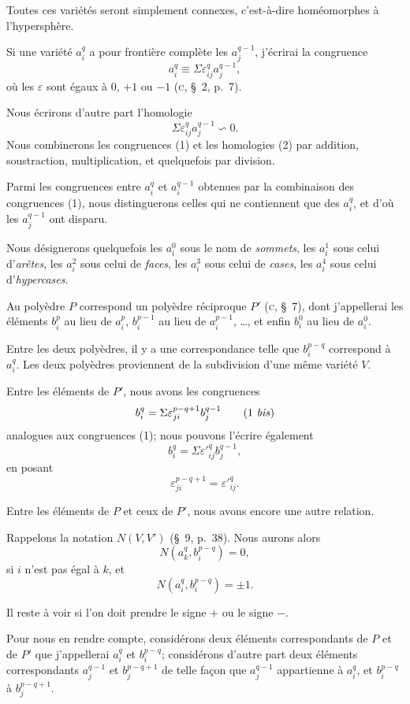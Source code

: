 \documentclass{article}
\begin{document}
Toutes ces variétés seront simplement connexes, c'est-à-dire homéomorphes à l'hypersphère.

Si une variété $a^{q}_{i}$ a pour frontière complète les $a^{q-1}_{j}$, j'écrirai la congruence
\[ a^{q}_{i} \equiv \Sigma \varepsilon^{q}_{ij} a^{q-1}_{j}, \tag{1} \]
où les $\varepsilon$ sont égaux à 0, $+1$ ou $-1$ (\textsc{c}, \S~2, p.\ 7).

Nous écrirons d'autre part l'homologie
\[ \Sigma \varepsilon^{q}_{ij} a^{q-1}_{j} \backsim 0. \tag{2} \]
Nous combinerons les congruences (1) et les homologies (2) par addition, soustraction, multiplication, et quelquefois par division.

Parmi les congruences entre $a^{q}_{i}$ et $a^{q-1}_{i}$ obtenues par la combinaison des congruences (1), nous distinguerons celles qui ne contiennent que des $a^{q}_{i}$, et d'où les $a^{q-1}_{j}$ ont disparu.

Nous désignerons quelquefois les $a^{0}_{i}$ sous le nom de \emph{sommets}, les $a^{1}_{i}$ sous celui d'\emph{arêtes}, les $a^{2}_{i}$ sous celui de \emph{faces}, les $a^{3}_{i}$ sous celui de \emph{cases}, les $a^{4}_{i}$ sous celui d'\emph{hypercases}.

Au polyèdre $P$ correspond un polyèdre réciproque $P'$ (\textsc{c}, \S~7), dont j'appellerai les éléments $b^{p}_{i}$ au lieu de $a^{p}_{i}$, $b^{p-1}_{i}$ au lieu de $a^{p-1}_{i}$, \ldots, et enfin $b^{0}_{i}$ au lieu de $a^{0}_{i}$.

Entre les deux polyèdres, il y a une correspondance telle que $b^{p-q}_{i}$ correspond à $a^{q}_{i}$. Les deux polyèdres proviennent de la subdivision d'une même variété $V$.

Entre les éléments de $P'$, nous avons les congruences
\[ b^{q}_{i} = \Sigma \varepsilon^{p-q+1}_{ji} b^{q-1}_{j} \tag{1 \textit{bis}} \]
analogues aux congruences (1); nous pouvons l'écrire également
\[ b^{q}_{i} = \Sigma \varepsilon'^{q}_{ij} b^{q-1}_{j}, \]
en posant
\[ \varepsilon^{p-q+1}_{ji} = \varepsilon'^{q}_{ij}. \]

Entre les éléments de $P$ et ceux de $P'$, nous avons encore une autre relation.

Rappelons la notation $N(V, V')$ (\S~9, p.\ 38). Nous aurons alors
\[ N(a^{q}_{k}, b^{p-q}_{i}) = 0, \]
si $i$ n'est pas égal à $k$, et
\[ N(a^{q}_{i}, b^{p-q}_{i}) = \pm 1. \]

Il reste à voir si l'on doit prendre le signe $+$ ou le signe $-$.

Pour nous en rendre compte, considérons deux éléments correspondants de $P$ et de $P'$ que j'appellerai $a^{q}_{i}$ et $b^{p-q}_{i}$; considérons d'autre part deux éléments correspondants $a^{q-1}_{j}$ et $b^{p-q+1}_{j}$ de telle façon que $a^{q-1}_{j}$ appartienne à $a^{q}_{i}$, et $b^{p-q}_{i}$ à $b^{p-q+1}_{j}$.
\end{document}

